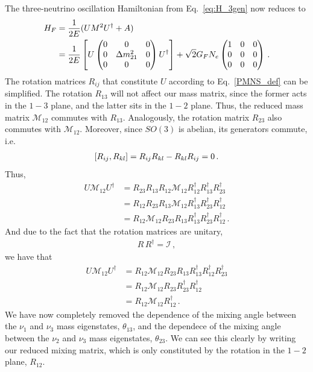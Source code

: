 The three-neutrino oscillation Hamiltonian from Eq.~\eqref{eq:H_3gen} %
now reduces to 
\begin{align}
    H_F &= \frac{1}{2E}(U M^2 U^\dagger + A) \nonumber \\
        &= \frac{1}{2E}\left[U \begin{pmatrix}
            0 & 0 & 0 \\
            0 & \dm_{21} & 0 \\
            0 & 0 & 0
        \end{pmatrix} U^\dagger\right] + \sqrt{2}G_F N_e \begin{pmatrix}
            1 & 0 & 0 \\
            0 & 0 & 0 \\
            0 & 0 & 0
        \end{pmatrix}\,. 
\end{align}
The rotation matrices $R_{ij}$ that constitute $U$ according to Eq.~\eqref{PMNS_def} can be simplified. The rotation $R_{13}$ will not affect our mass matrix, since the former acts in the $1-3$ plane, and the latter sits in the $1-2$ plane. Thus, the reduced mass matrix $\mathcal{M}_{12}$ commutes with $R_{13}$. Analogously, the  rotation matrix $R_{23}$ also commutes with $\mathcal{M}_{12}$.
Moreover, since $SO(3)$ is abelian, its generators commute, i.e.
\begin{align}
    \commutator{R_{ij}}{R_{kl}} = R_{ij}R_{kl} - R_{kl}R_{ij} = 0\,.
\end{align}
Thus,
\begin{align}
    U \mathcal{M}_{12} U^\dagger &=
    R_{23}R_{13}R_{12} \mathcal{M}_{12}  R_{12}^\dagger R_{13}^\dagger  R_{23}^\dagger \nonumber \\
    &= R_{12}R_{23}R_{13} \mathcal{M}_{12}  R_{13}^\dagger R_{23}^\dagger R_{12}^\dagger   \nonumber \\
    &= R_{12}\mathcal{M}_{12} R_{23} R_{13}   R_{13}^\dagger R_{23}^\dagger R_{12}^\dagger  \,.
\end{align}
And due to the fact that the rotation matrices are unitary,
\begin{align}
    R\,R^\dagger = \mathcal{I}\,,
\end{align}
we have that 
\begin{align}
    U \mathcal{M}_{12} U^\dagger &= R_{12}\mathcal{M}_{12}R_{23} R_{13}   R_{13}^\dagger R_{12}^\dagger  R_{23}^\dagger \nonumber \\
    &= R_{12}\mathcal{M}_{12}R_{23} R_{23}^\dagger  R_{12}^\dagger \nonumber \\
    &= R_{12}\mathcal{M}_{12}  R_{12}^\dagger\,.
\end{align}
We have now completely removed the dependence of the mixing angle between the $\nu_1$ and $\nu_3$ mass eigenstates, $\theta_{13}$, and the dependece of the mixing angle between the $\nu_2$ and $\nu_3$ mass eigenstates, $\theta_{23}$.
We can see this clearly by writing our reduced mixing matrix, which is only constituted by the rotation in the $1-2$ plane, $R_{12}$.

